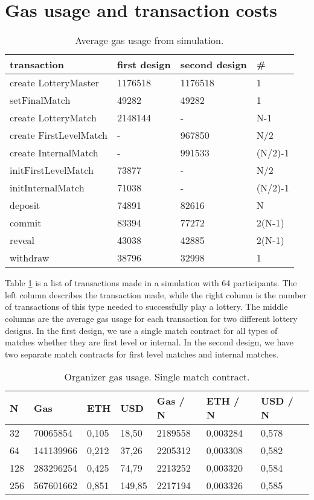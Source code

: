 \section{Gas usage and transaction costs}
\label{sec:gas}

\begin{table}[h]
\centering
\caption{Average gas usage from simulation.}
\label{tab:gas-usage}
\begin{tabular}{|l|l|l|l|}
\hline

transaction & first design & second design & \# \\ \hline
create LotteryMaster & 1176518 & 1176518 & 1 \\ \hline
setFinalMatch & 49282 & 49282 & 1 \\ \hline
create LotteryMatch & 2148144 & - & N-1 \\ \hline
create FirstLevelMatch & - & 967850 & N/2 \\ \hline
create InternalMatch & - & 991533 & (N/2)-1 \\ \hline
initFirstLevelMatch & 73877 & - & N/2 \\ \hline
initInternalMatch & 71038 & - & (N/2)-1 \\ \hline
deposit & 74891 & 82616 & N \\ \hline
commit & 83394 & 77272 & 2(N-1) \\ \hline
reveal & 43038 & 42885 & 2(N-1) \\ \hline
withdraw & 38796 & 32998 & 1 \\ \hline

\end{tabular}
\end{table}

\noindent
Table \ref{tab:gas-usage} is a list of transactions made in a simulation with 64 participants. The left column describes the transaction made, while the right column is the number of transactions of this type needed to successfully play a lottery. The middle columns are the average gas usage for each transaction for two different lottery designs. In the first design, we use a single match contract for all types of matches whether they are first level or internal. In the second design, we have two separate match contracts for first level matches and internal matches. 

\begin{table}[h]
\centering
\caption{Organizer gas usage. Single match contract.}
\label{tab:org-gas-usage-single}
\begin{tabular}{|l|l|l|l|l|l|l|}
\hline

N & Gas & ETH & USD & Gas / N & ETH / N & USD / N \\ \hline
32 & 70065854 & 0,105 & 18,50 & 2189558 & 0,003284 & 0,578 \\ \hline
64 & 141139966 & 0,212 & 37,26 & 2205312 & 0,003308 & 0,582 \\ \hline
128 & 283296254 & 0,425 & 74,79 & 2213252 & 0,003320 & 0,584 \\ \hline
256 & 567601662 & 0,851 & 149,85 & 2217194 & 0,003326 & 0,585 \\ \hline

\end{tabular}
\end{table}

